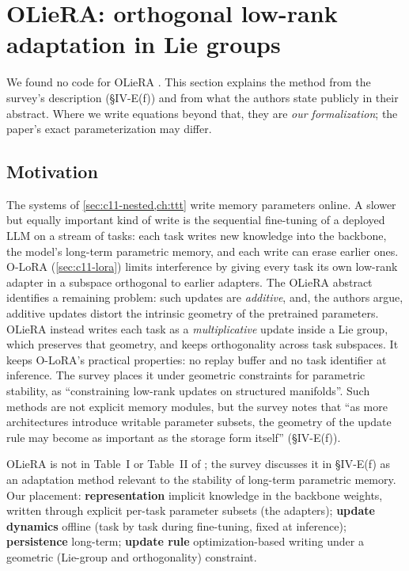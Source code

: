 \section{OLieRA: orthogonal low-rank adaptation in Lie groups}\label{sec:c11-olieRA}

\begin{pitfall}[title={No public code}]
We found no code for OLieRA \citep{cao2025olora}. This section explains the method from the
survey's description (\S IV-E(f)) and from what the authors state publicly in their abstract.
Where we write equations beyond that, they are \emph{our formalization}; the paper's exact
parameterization may differ.
\end{pitfall}

\subsection{Motivation}\label{sec:c11-ol-motivation}

The systems of \cref{sec:c11-nested,ch:ttt} write memory parameters online. A slower but equally
important kind of write is the sequential fine-tuning of a deployed LLM on a stream of tasks:
each task writes new knowledge into the backbone, the model's long-term parametric memory, and
each write can erase earlier ones. O-LoRA (\cref{sec:c11-lora}) limits interference by giving
every task its own low-rank adapter in a subspace orthogonal to earlier adapters. The OLieRA
abstract identifies a remaining problem: such updates are \emph{additive}, and, the authors argue,
additive updates distort the intrinsic geometry of the pretrained parameters. OLieRA instead writes
each task as a \emph{multiplicative} update inside a Lie group, which preserves that geometry, and
keeps orthogonality across task subspaces. It keeps O-LoRA's practical properties: no replay
buffer and no task identifier at inference. The survey places it under geometric constraints for
parametric stability, as ``constraining low-rank updates on structured manifolds''. Such methods
are not explicit memory modules, but the survey notes that ``as more architectures introduce
writable parameter subsets, the geometry of the update rule may become as important as the
storage form itself'' (\S IV-E(f)).

\begin{taxonomy}
OLieRA is not in Table~I or Table~II of \citet{zhoubian2026memory}; the survey discusses it in
\S IV-E(f) as an adaptation method relevant to the stability of long-term parametric memory. Our
placement: \textbf{representation} implicit knowledge in the backbone weights, written through
explicit per-task parameter subsets (the adapters); \textbf{update dynamics} offline (task by task
during fine-tuning, fixed at inference); \textbf{persistence} long-term; \textbf{update rule}
optimization-based writing under a geometric (Lie-group and orthogonality) constraint.
\end{taxonomy}

